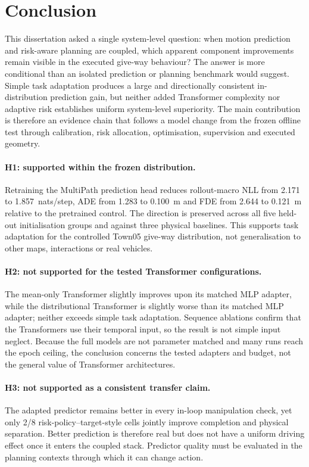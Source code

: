 \section{Conclusion}
\label{sec:conclusion}

This dissertation asked a single system-level question: when motion prediction
and risk-aware planning are coupled, which apparent component improvements
remain visible in the executed give-way behaviour? The answer is more
conditional than an isolated prediction or planning benchmark would suggest.
Simple task adaptation produces a large and directionally consistent
in-distribution prediction gain, but neither added Transformer complexity nor
adaptive risk establishes uniform system-level superiority. The main
contribution is therefore an evidence chain that follows a model change from
the frozen offline test through calibration, risk allocation, optimisation,
supervision and executed geometry.

\paragraph{H1: supported within the frozen distribution.}
Retraining the MultiPath prediction head reduces rollout-macro NLL from 2.171
to 1.857~nats/step, ADE from 1.283 to 0.100~m and FDE from 2.644 to 0.121~m
relative to the pretrained control. The direction is preserved across all five
held-out initialisation groups and against three physical baselines. This
supports task adaptation for the controlled Town05 give-way distribution, not
generalisation to other maps, interactions or real vehicles.

\paragraph{H2: not supported for the tested Transformer configurations.}
The mean-only Transformer slightly improves upon its matched MLP adapter, while
the distributional Transformer is slightly worse than its matched MLP adapter;
neither exceeds simple task adaptation. Sequence ablations confirm that the
Transformers use their temporal input, so the result is not simple input
neglect. Because the full models are not parameter matched and many runs reach
the epoch ceiling, the conclusion concerns the tested adapters and budget,
not the general value of Transformer architectures.

\paragraph{H3: not supported as a consistent transfer claim.}
The adapted predictor remains better in every in-loop manipulation check, yet
only 2/8 risk-policy--target-style cells jointly improve completion and
physical separation. Better prediction is therefore real but does not have a
uniform driving effect once it enters the coupled stack. Predictor quality
must be evaluated in the planning contexts through which it can change action.

